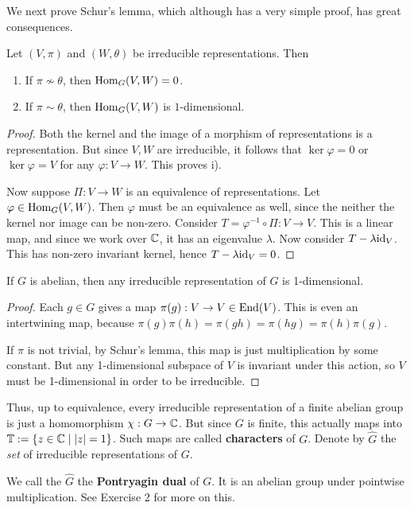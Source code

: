 \documentclass[11pt, english]{article}
\begin{document}
We next prove Schur's lemma, which although has a very simple proof, has great consequences.

\begin{prop}
Let $(V,\pi)$ and $(W,\theta)$ be irreducible representations. Then
\begin{enumerate}
\item If $\pi \not \sim \theta$, then $\operatorname{Hom}_G(V,W)=0$.
\item If $\pi \sim \theta$, then $\operatorname{Hom}_G(V,W)$ is $1$-dimensional. 
\end{enumerate}
\end{prop}
\begin{proof}
Both the kernel and the image of a morphism of representations is a representation. But since $V,W$ are irreducible, it follows that $\ker \varphi = 0$ or $\ker \varphi  = V$ for any $\varphi:V \to W$. This proves i). 

Now suppose $\Pi:V \to W$ is an equivalence of representations. Let $\varphi \in \operatorname{Hom}_G(V,W)$. Then $\varphi$ must be an equivalence as well, since the neither the kernel nor image can be non-zero. Consider $T=\varphi^{-1} \circ \Pi: V \to V$. This is a linear map, and since we work over $\mathbb{C}$, it has an eigenvalue $\lambda$. Now consider $T-\lambda \text{id}_V$. This has non-zero invariant kernel, hence $T-\lambda \text{id}_V=0$. 
\end{proof}

\begin{prop}
 If $G$ is abelian, then any irreducible representation of $G$ is 1-dimensional.
\end{prop}
\begin{proof}
Each $g \in G$ gives a map $\pi(g):V \to V \in \operatorname{End}(V)$. This is even an intertwining map, because $\pi(g)\pi(h)=\pi(gh)=\pi(hg)=\pi(h)\pi(g)$.

If $\pi$ is not trivial, by Schur's lemma, this map is just multiplication by some constant. But any 1-dimensional subspace of $V$ is invariant under this action, so $V$ must be 1-dimensional in order to be irreducible.
\end{proof}

Thus, up to equivalence, every irreducible representation of a finite abelian group is just a homomorphism $\chi:G \to \mathbb{C}$. But since $G$ is finite, this actually maps into $\mathbb T := \{ z \in \mathbb{C} \mid \lvert z \rvert = 1 \}$. Such maps are called \textbf{characters} of $G$. Denote by $\hat G$ the \emph{set} of irreducible representations of $G$. 

We call the $\hat G$ the \textbf{Pontryagin dual} of $G$. It is an abelian group under pointwise multiplication. See Exercise 2 for more on this.
\end{document}
